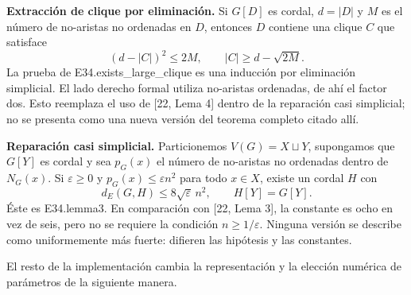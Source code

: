 \documentclass[spanish,11pt,a4paper]{article}
\begin{document}
\textbf{Extracción de clique por eliminación.} Si \(G[D]\) es cordal, \(d=|D|\) y \(M\) es el número de no-aristas no ordenadas en \(D\), entonces \(D\) contiene una clique \(C\) que satisface \[
(d-|C|)^2\le2M,\qquad |C|\ge d-\sqrt{2M}.
\tag{F.9}
\] La prueba de {\ttfamily\small E34.\discretionary{\hbox{\ensuremath{\hookrightarrow}}}{}{}exists\_\discretionary{\hbox{\ensuremath{\hookrightarrow}}}{}{}large\_\discretionary{\hbox{\ensuremath{\hookrightarrow}}}{}{}clique} es una inducción por eliminación simplicial. El lado derecho formal utiliza no-aristas ordenadas, de ahí el factor dos. Esto reemplaza el uso de {[}22, Lema 4{]} dentro de la reparación casi simplicial; no se presenta como una nueva versión del teorema completo citado allí.

\textbf{Reparación casi simplicial.} Particionemos \(V(G)=X\sqcup Y\), supongamos que \(G[Y]\) es cordal y sea \(p_G(x)\) el número de no-aristas no ordenadas dentro de \(N_G(x)\). Si \(\varepsilon\ge0\) y \(p_G(x)\le\varepsilon n^2\) para todo \(x\in X\), existe un cordal \(H\) con \[
d_E(G,H)\le8\sqrt{\varepsilon}\,n^2,\qquad H[Y]=G[Y].
\tag{F.10}
\] Éste es {\ttfamily\small E34.\discretionary{\hbox{\ensuremath{\hookrightarrow}}}{}{}lemma3}. En comparación con {[}22, Lema 3{]}, la constante es ocho en vez de seis, pero no se requiere la condición \(n\ge1/\varepsilon\). Ninguna versión se describe como uniformemente más fuerte: difieren las hipótesis y las constantes.

El resto de la implementación cambia la representación y la elección numérica de parámetros de la siguiente manera.

\end{document}
